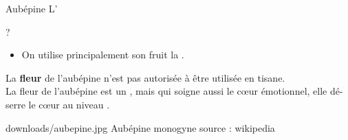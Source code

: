 \ficheidentiteplante
{Aubépine}
{%
    L' 
}
{%
    
}
{%
    ?
}
{%
    \begin{itemize}[label = \bcplume]
        \item On utilise principalement son fruit la .
    \end{itemize}
}
{%
    \begin{Remarque}
        La \textbf{fleur} de l'aubépine n'est pas autorisée à être utilisée en tisane.\\

        La fleur de l'aubépine est un , mais qui soigne aussi le cœur émotionnel, elle dé-serre le cœur au niveau .
    \end{Remarque}
}
{%
    downloads/aubepine.jpg
}
{%
    Aubépine monogyne
}
{%
    source : wikipedia
}